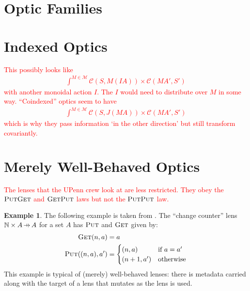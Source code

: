 \documentclass[11pt,a4paper]{article}
\theoremstyle{plain}
\theoremstyle{definition}
\newtheorem{example}[theorem]{Example}
\newcommand{\C}{\mathscr{C}}
\newcommand{\M}{\mathscr{M}}
\newcommand{\bN}{\mathbb{N}}
\newcommand{\fget}{\textsc{Get}}
\newcommand{\fput}{\textsc{Put}}
\newcommand{\hto}{\ensuremath{\,\mathaccent\shortmid\rightarrow\,}}
\newcommand{\todo}[1]{\textcolor{red}{\small #1}}
\begin{document}
\section{Optic Families}
\section{Indexed Optics}
\todo{
This possibly looks like
\begin{align*}
\int^{M \in \M} \C(S, M(IA)) \times \C(M A', S')
\end{align*}
with another monoidal action $I$. The $I$ would need to distribute over $M$ in some way. ``Coindexed'' optics seem to have 
\begin{align*}
\int^{M \in \M} \C(S, J(MA)) \times \C(M A', S')
\end{align*}
which is why they pass information `in the other direction' but still transform covariantly.
}
\section{Merely Well-Behaved Optics}
\todo{
The lenses that the UPenn crew look at are less restricted. They obey the $\fput\fget$ and $\fget\fput$ laws but not the $\fput\fput$ law. 
}

\begin{example}
The following example is taken from \cite{AClearPictureOfLensLaws}. The ``change counter'' lens $\bN \times A \hto A$ for a set $A$ has $\fput$ and $\fget$ given by:
\begin{align*}
\fget(n, a) &= a \\
\fput((n, a), a') &= \begin{cases}
(n, a) & \text{if } a = a' \\
(n+1, a') & \text{otherwise}
\end{cases}
\end{align*}
This example is typical of (merely) well-behaved lenses: there is metadata carried along with the target of a lens that mutates as the lens is used.
\end{example}
\end{document}

